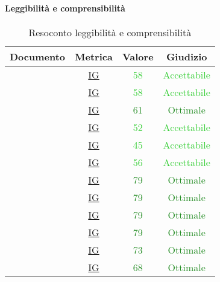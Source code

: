 					\paragraph{Leggibilità e comprensibilità}
						\begin{table}[H]
							\centering
							\small
							\begin{tabular}{c | c | c | c}
								\hline
								\textbf{Documento} & \textbf{Metrica}    & \textbf{Valore} & \textbf{Giudizio} \\ \hline
								      \pdpv        & \hyperref[MLEC]{IG} &  \textcolor{LimeGreen}{58}              & \textcolor{LimeGreen}{Accettabile} \\
								      \pdqv        & \hyperref[MLEC]{IG} &  \textcolor{LimeGreen}{58}               &  \textcolor{LimeGreen}{Accettabile} \\
								      \ndpv        & \hyperref[MLEC]{IG} &  \textcolor{ForestGreen}{61}               & \textcolor{ForestGreen}{Ottimale}\\
								      \sdfv        & \hyperref[MLEC]{IG} &  \textcolor{LimeGreen}{52}               &  \textcolor{LimeGreen}{Accettabile}\\
								      \adrv        & \hyperref[MLEC]{IG} &  \textcolor{LimeGreen}{45}               &  \textcolor{LimeGreen}{Accettabile}\\
								       \glv        & \hyperref[MLEC]{IG} &  \textcolor{LimeGreen}{56}               & \textcolor{LimeGreen}{Accettabile} \\
								      \vunoi       & \hyperref[MLEC]{IG} &  \textcolor{ForestGreen}{79}               & \textcolor{ForestGreen}{Ottimale}\\
								      \vduei       & \hyperref[MLEC]{IG} &  \textcolor{ForestGreen}{79}               & \textcolor{ForestGreen}{Ottimale}\\
								      \vtrei       & \hyperref[MLEC]{IG} &  \textcolor{ForestGreen}{79}               & \textcolor{ForestGreen}{Ottimale}\\
								    \vquattroi     & \hyperref[MLEC]{IG} &  \textcolor{ForestGreen}{79}               & \textcolor{ForestGreen}{Ottimale}\\
								      \vunoe       & \hyperref[MLEC]{IG} &   \textcolor{ForestGreen}{73}              & \textcolor{ForestGreen}{Ottimale}\\
								      \vduee       & \hyperref[MLEC]{IG} &   \textcolor{ForestGreen}{68}              & \textcolor{ForestGreen}{Ottimale}\\ \hline
							\end{tabular}
							\caption{Resoconto leggibilità e comprensibilità}
							\label{tab_resoconto_leggibilità_e_comprensibilità}
						\end{table}
					
